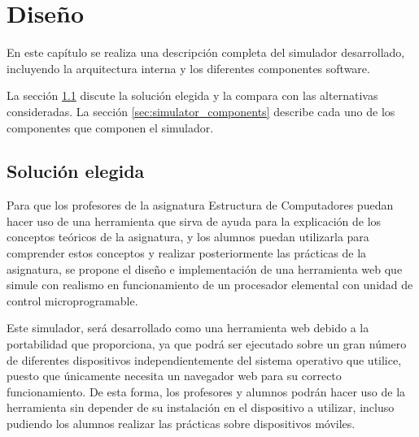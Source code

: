 \chead[]{}
\renewcommand{\headrulewidth}{0.5pt}

\lfoot[]{}
\cfoot[]{}
\rfoot[]{}
\renewcommand{\footrulewidth}{0pt}

\chapter{Diseño}
\label{ch:design}

En este capítulo se realiza una descripción completa del simulador desarrollado, incluyendo la arquitectura interna y los diferentes componentes software.

La sección \ref{sec:solution_selection} discute la solución elegida y la compara con las alternativas consideradas. La sección \ref{sec:simulator_components} describe cada uno de los componentes que componen el simulador.

\section{Solución elegida}
\label{sec:solution_selection}

Para que los profesores de la asignatura Estructura de Computadores puedan hacer uso de una herramienta que sirva de ayuda para la explicación de los conceptos teóricos de la asignatura, y los alumnos puedan utilizarla para comprender estos conceptos y realizar posteriormente las prácticas de la asignatura, se propone el diseño e implementación de una herramienta web que simule con realismo en funcionamiento de un procesador elemental con unidad de control microprogramable.

Este simulador, será desarrollado como una herramienta web debido a la portabilidad que proporciona, ya que podrá ser ejecutado sobre un gran número de diferentes dispositivos independientemente del sistema operativo que utilice, puesto que únicamente necesita un navegador web para su correcto funcionamiento. De esta forma, los profesores y alumnos podrán hacer uso de la herramienta sin depender de su instalación en el dispositivo a utilizar, incluso pudiendo los alumnos realizar las prácticas sobre dispositivos móviles.


